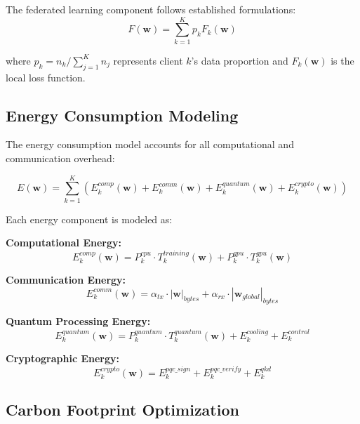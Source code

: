 \documentclass[10pt,journal,compsoc]{IEEEtran}
\newcommand{\vect}[1]{\mathbf{#1}}
\begin{document}
The federated learning component follows established formulations:
\begin{equation}
F(\vect{w}) = \sum_{k=1}^{K} p_k F_k(\vect{w})
\label{eq:federated_loss}
\end{equation}

where $p_k = n_k / \sum_{j=1}^K n_j$ represents client $k$'s data proportion and $F_k(\vect{w})$ is the local loss function.

\subsection{Energy Consumption Modeling}

The energy consumption model accounts for all computational and communication overhead:

\begin{equation}
E(\vect{w}) = \sum_{k=1}^{K} \left( E_k^{comp}(\vect{w}) + E_k^{comm}(\vect{w}) + E_k^{quantum}(\vect{w}) + 
E_k^{crypto}(\vect{w}) \right)
\label{eq:energy_model}
\end{equation}

Each energy component is modeled as:

\textbf{Computational Energy:}
\begin{equation}
E_k^{comp}(\vect{w}) = P_k^{cpu} \cdot T_k^{training}(\vect{w}) + P_k^{gpu} \cdot T_k^{gpu}(\vect{w})
\label{eq:comp_energy}
\end{equation}

\textbf{Communication Energy:}
\begin{equation}
E_k^{comm}(\vect{w}) = \alpha_{tx} \cdot |\vect{w}|_{bytes} + \alpha_{rx} \cdot |\vect{w}_{global}|_{bytes}
\label{eq:comm_energy}
\end{equation}

\textbf{Quantum Processing Energy:}
\begin{equation}
E_k^{quantum}(\vect{w}) = P_k^{quantum} \cdot T_k^{quantum}(\vect{w}) + E_k^{cooling} + E_k^{control}
\label{eq:quantum_energy}
\end{equation}

\textbf{Cryptographic Energy:}
\begin{equation}
E_k^{crypto}(\vect{w}) = E_k^{pqc\_sign} + E_k^{pqc\_verify} + E_k^{qkd}
\label{eq:crypto_energy}
\end{equation}

\subsection{Carbon Footprint Optimization}
\end{document}
